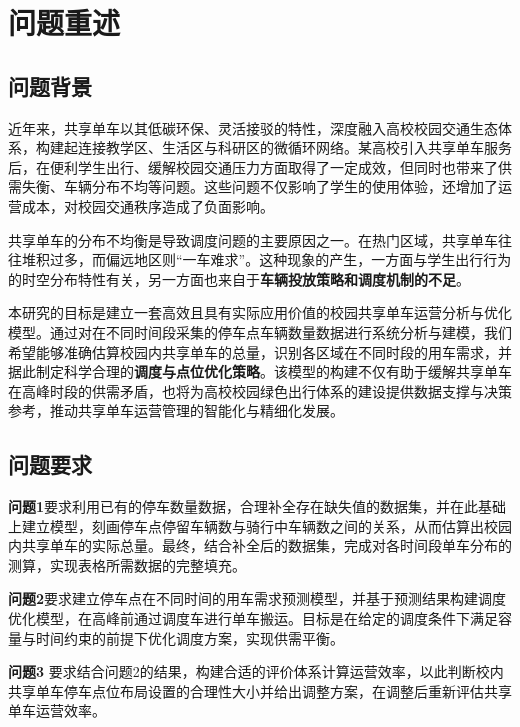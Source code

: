 \documentclass[withoutpreface,bwprint]{cumcmthesis}
\begin{document}
\tableofcontents  %
\newpage

\section{问题重述}
\subsection{问题背景}
近年来，共享单车以其低碳环保、灵活接驳的特性，深度融入高校校园交通生态体系，构建起连接教学区、生活区与科研区的微循环网络。某高校引入共享单车服务后，在便利学生出行、缓解校园交通压力方面取得了一定成效，但同时也带来了供需失衡、车辆分布不均等问题。这些问题不仅影响了学生的使用体验，还增加了运营成本，对校园交通秩序造成了负面影响。

共享单车的分布不均衡是导致调度问题的主要原因之一。在热门区域，共享单车往往堆积过多，而偏远地区则“一车难求”。这种现象的产生，一方面与学生出行行为的时空分布特性有关，另一方面也来自于\textbf{车辆投放策略和调度机制的不足}。

本研究的目标是建立一套高效且具有实际应用价值的校园共享单车运营分析与优化模型。通过对在不同时间段采集的停车点车辆数量数据进行系统分析与建模，我们希望能够准确估算校园内共享单车的总量，识别各区域在不同时段的用车需求，并据此制定科学合理的\textbf{调度与点位优化策略}。该模型的构建不仅有助于缓解共享单车在高峰时段的供需矛盾，也将为高校校园绿色出行体系的建设提供数据支撑与决策参考，推动共享单车运营管理的智能化与精细化发展。


\subsection{问题要求}

\textbf{问题1}要求利用已有的停车数量数据，合理补全存在缺失值的数据集，并在此基础上建立模型，刻画停车点停留车辆数与骑行中车辆数之间的关系，从而估算出校园内共享单车的实际总量。最终，结合补全后的数据集，完成对各时间段单车分布的测算，实现表格所需数据的完整填充。

\textbf{问题2}要求建立停车点在不同时间的用车需求预测模型，并基于预测结果构建调度优化模型，在高峰前通过调度车进行单车搬运。目标是在给定的调度条件下满足容量与时间约束的前提下优化调度方案，实现供需平衡。

\textbf{问题3} 要求结合问题2的结果，构建合适的评价体系计算运营效率，以此判断校内共享单车停车点位布局设置的合理性大小并给出调整方案，在调整后重新评估共享单车运营效率。
\end{document}
